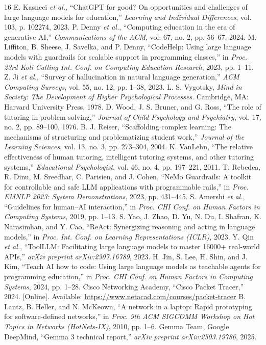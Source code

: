 \documentclass[conference,a4paper]{IEEEtran}
\begin{document}
\balance
\footnotesize
\begin{thebibliography}{16}
 E. Kasneci \emph{et al.}, ``ChatGPT for good? On opportunities and challenges of large language models for education,'' \emph{Learning and Individual Differences}, vol. 103, p. 102274, 2023.
 P. Denny \emph{et al.}, ``Computing education in the era of generative AI,'' \emph{Communications of the ACM}, vol. 67, no. 2, pp. 56--67, 2024.
 M. Liffiton, B. Sheese, J. Savelka, and P. Denny, ``CodeHelp: Using large language models with guardrails for scalable support in programming classes,'' in \emph{Proc. 23rd Koli Calling Int. Conf. on Computing Education Research}, 2023, pp. 1--11.
 Z. Ji \emph{et al.}, ``Survey of hallucination in natural language generation,'' \emph{ACM Computing Surveys}, vol. 55, no. 12, pp. 1--38, 2023.
 L. S. Vygotsky, \emph{Mind in Society: The Development of Higher Psychological Processes}. Cambridge, MA: Harvard University Press, 1978.
 D. Wood, J. S. Bruner, and G. Ross, ``The role of tutoring in problem solving,'' \emph{Journal of Child Psychology and Psychiatry}, vol. 17, no. 2, pp. 89--100, 1976.
 B. J. Reiser, ``Scaffolding complex learning: The mechanisms of structuring and problematizing student work,'' \emph{Journal of the Learning Sciences}, vol. 13, no. 3, pp. 273--304, 2004.
 K. VanLehn, ``The relative effectiveness of human tutoring, intelligent tutoring systems, and other tutoring systems,'' \emph{Educational Psychologist}, vol. 46, no. 4, pp. 197--221, 2011.
 T. Rebedea, R. Dinu, M. Sreedhar, C. Parisien, and J. Cohen, ``NeMo Guardrails: A toolkit for controllable and safe LLM applications with programmable rails,'' in \emph{Proc. EMNLP 2023: System Demonstrations}, 2023, pp. 431--445.
 S. Amershi \emph{et al.}, ``Guidelines for human--AI interaction,'' in \emph{Proc. CHI Conf. on Human Factors in Computing Systems}, 2019, pp. 1--13.
 S. Yao, J. Zhao, D. Yu, N. Du, I. Shafran, K. Narasimhan, and Y. Cao, ``ReAct: Synergizing reasoning and acting in language models,'' in \emph{Proc. Int. Conf. on Learning Representations (ICLR)}, 2023.
 Y. Qin \emph{et al.}, ``ToolLLM: Facilitating large language models to master 16000+ real-world APIs,'' \emph{arXiv preprint arXiv:2307.16789}, 2023.
 H. Jin, S. Lee, H. Shin, and J. Kim, ``Teach AI how to code: Using large language models as teachable agents for programming education,'' in \emph{Proc. CHI Conf. on Human Factors in Computing Systems}, 2024, pp. 1--28.
 Cisco Networking Academy, ``Cisco Packet Tracer,'' 2024. [Online]. Available: \url{https://www.netacad.com/courses/packet-tracer}
 B. Lantz, B. Heller, and N. McKeown, ``A network in a laptop: Rapid prototyping for software-defined networks,'' in \emph{Proc. 9th ACM SIGCOMM Workshop on Hot Topics in Networks (HotNets-IX)}, 2010, pp. 1--6.
 Gemma Team, Google DeepMind, ``Gemma 3 technical report,'' \emph{arXiv preprint arXiv:2503.19786}, 2025.
\end{thebibliography}
\end{document}
